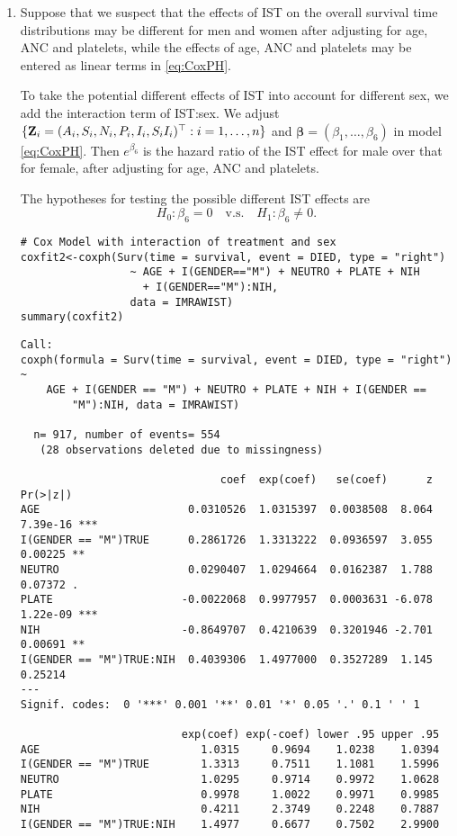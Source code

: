 \documentclass[11pt]{article}
\newcommand{\bZ}{{\bf{Z}}}
\newcommand{\bbeta}{{\bm \beta}}
\begin{document}
\begin{enumerate}
\item Suppose that we suspect that the effects of IST on the overall survival
  time distributions may be different for men and women after adjusting for age,
  ANC and platelets, while the effects of age, ANC and platelets may be entered
  as linear terms in \eqref{eq:CoxPH}.

  To take the potential different effects of IST into account for different sex,
  we add the interaction term of IST:sex. We adjust
  $\{\bZ_i=(A_i,S_i,N_i,P_i,I_i, S_iI_i)^{\top}:i=1,\dots,n\}$ and $\bbeta =
  (\beta_1,\dots,\beta_6)$ in model \eqref{eq:CoxPH}. Then $e^{\beta_6}$ is the
  hazard ratio of the IST effect for male over that for female, after
  adjusting for age, ANC and platelets.

  The hypotheses for testing the possible different IST effects are
\begin{equation}
\label{eq:hypothesis}
H_0: \beta_6=0\quad\text{v.s.}\quad H_1:\beta_6\neq 0.
\end{equation}

\begin{lstlisting}
# Cox Model with interaction of treatment and sex
coxfit2<-coxph(Surv(time = survival, event = DIED, type = "right") 
                 ~ AGE + I(GENDER=="M") + NEUTRO + PLATE + NIH 
                   + I(GENDER=="M"):NIH,
                 data = IMRAWIST)
summary(coxfit2)
\end{lstlisting}

\begin{Verbatim}[fontsize=\small]
Call:
coxph(formula = Surv(time = survival, event = DIED, type = "right") ~ 
    AGE + I(GENDER == "M") + NEUTRO + PLATE + NIH + I(GENDER == 
        "M"):NIH, data = IMRAWIST)

  n= 917, number of events= 554 
   (28 observations deleted due to missingness)

                               coef  exp(coef)   se(coef)      z Pr(>|z|)
AGE                       0.0310526  1.0315397  0.0038508  8.064 7.39e-16 ***
I(GENDER == "M")TRUE      0.2861726  1.3313222  0.0936597  3.055  0.00225 **
NEUTRO                    0.0290407  1.0294664  0.0162387  1.788  0.07372 .
PLATE                    -0.0022068  0.9977957  0.0003631 -6.078 1.22e-09 ***
NIH                      -0.8649707  0.4210639  0.3201946 -2.701  0.00691 **
I(GENDER == "M")TRUE:NIH  0.4039306  1.4977000  0.3527289  1.145  0.25214    
---
Signif. codes:  0 '***' 0.001 '**' 0.01 '*' 0.05 '.' 0.1 ' ' 1

                         exp(coef) exp(-coef) lower .95 upper .95
AGE                         1.0315     0.9694    1.0238    1.0394
I(GENDER == "M")TRUE        1.3313     0.7511    1.1081    1.5996
NEUTRO                      1.0295     0.9714    0.9972    1.0628
PLATE                       0.9978     1.0022    0.9971    0.9985
NIH                         0.4211     2.3749    0.2248    0.7887
I(GENDER == "M")TRUE:NIH    1.4977     0.6677    0.7502    2.9900


\end{Verbatim}
\end{enumerate}
\end{document}
